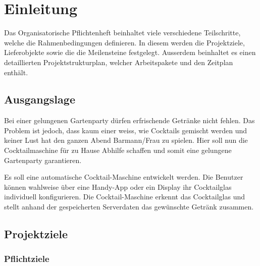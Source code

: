 \clearpage
\section{Einleitung}\label{sec:Einleitung}
Das Organisatorische Pflichtenheft beinhaltet viele verschiedene Teilschritte, welche die Rahmenbedingungen definieren. In diesem werden die Projektziele, Lieferobjekte sowie die die Meilensteine festgelegt. Ausserdem beinhaltet es einen detaillierten Projektstrukturplan, welcher Arbeitspakete und den Zeitplan enthält.

\subsection{Ausgangslage}\label{subsec:Ausgangslage}

Bei einer gelungenen Gartenparty dürfen erfrischende Getränke nicht fehlen. Das Problem ist jedoch, dass kaum einer weiss, wie Cocktails gemischt werden und keiner Lust hat den ganzen Abend Barmann/Frau zu spielen. Hier soll nun die Cocktailmaschine für zu Hause Abhilfe schaffen und somit eine gelungene Gartenparty garantieren.

Es soll eine automatische Cocktail-Maschine entwickelt werden. Die Benutzer können wahlweise über eine Handy-App oder ein Display ihr Cocktailglas individuell konfigurieren. Die Cocktail-Maschine erkennt das Cocktailglas und stellt anhand der gespeicherten Serverdaten das gewünschte Getränk zusammen. 
 
\newpage
\subsection{Projektziele}\label{subsec:Projektziele}

\subsubsection{Pflichtziele}\label{sec:Pflichtziele}

